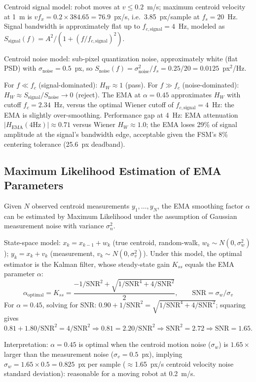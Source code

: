 \begin{eqblock}
Centroid signal model: robot moves at $v\leq0.2$~m/s; maximum centroid velocity at 1~m is $v f_x = 0.2\times384.65=76.9$~px/s, i.e.\ 3.85~px/sample at $f_s=20$~Hz. Signal bandwidth is approximately flat up to $f_{c,\text{signal}}=4$~Hz, modeled as $S_{\text{signal}}(f) = A^2/(1+(f/f_{c,\text{signal}})^2)$.

Centroid noise model: sub-pixel quantization noise, approximately white (flat PSD) with $\sigma_{\text{noise}}=0.5$~px, so $S_{\text{noise}}(f) = \sigma_{\text{noise}}^2/f_s = 0.25/20 = 0.0125$~px$^2$/Hz.

For $f\ll f_c$ (signal-dominated): $H_W\approx1$ (pass). For $f\gg f_c$ (noise-dominated): $H_W\approx S_{\text{signal}}/S_{\text{noise}}\to0$ (reject). The EMA at $\alpha=0.45$ approximates $H_W$ with cutoff $f_c=2.34$~Hz, versus the optimal Wiener cutoff of $f_{c,\text{signal}}=4$~Hz: the EMA is slightly over-smoothing. Performance gap at 4~Hz: EMA attenuation $|H_{\text{EMA}}(4\text{Hz})|\approx0.71$ versus Wiener $H_W\approx1.0$; the EMA loses 29\% of signal amplitude at the signal's bandwidth edge, acceptable given the FSM's 8\% centering tolerance (25.6~px deadband).
\end{eqblock}

\subsection{Maximum Likelihood Estimation of EMA Parameters}

Given $N$ observed centroid measurements $y_1,\dots,y_N$, the EMA smoothing factor $\alpha$ can be estimated by Maximum Likelihood under the assumption of Gaussian measurement noise with variance $\sigma_n^2$.

\begin{eqblock}
State-space model: $x_k = x_{k-1}+w_k$ (true centroid, random-walk, $w_k\sim N(0,\sigma_w^2)$); $y_k = x_k+v_k$ (measurement, $v_k\sim N(0,\sigma_v^2)$). Under this model, the optimal estimator is the Kalman filter, whose steady-state gain $K_{ss}$ equals the EMA parameter $\alpha$:
\begin{equation}
\alpha_{\text{optimal}} = K_{ss} = \frac{-1/\text{SNR}^2 + \sqrt{1/\text{SNR}^4 + 4/\text{SNR}^2}}{2}, \qquad \text{SNR} = \sigma_w/\sigma_v
\end{equation}
For $\alpha=0.45$, solving for SNR: $0.90+1/\text{SNR}^2 = \sqrt{1/\text{SNR}^4+4/\text{SNR}^2}$; squaring gives $0.81+1.80/\text{SNR}^2 = 4/\text{SNR}^2 \Rightarrow 0.81 = 2.20/\text{SNR}^2 \Rightarrow \text{SNR}^2=2.72 \Rightarrow \text{SNR}=1.65$.

Interpretation: $\alpha=0.45$ is optimal when the centroid motion noise ($\sigma_w$) is $1.65\times$ larger than the measurement noise ($\sigma_v=0.5$~px), implying $\sigma_w = 1.65\times0.5 = 0.825$~px per sample ($\approx$1.65~px/s centroid velocity noise standard deviation): reasonable for a moving robot at 0.2~m/s.
\end{eqblock}

